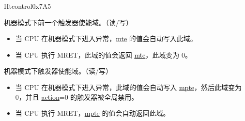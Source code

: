 \begin{register}{H}{tcontrol}{0x7A5}\label{regdesc:TCONTROL}
%
%
%
%
\regnewline%
\begin{regdesc}\begin{reglist}
\label{fielddesc:TCONTROLMPTE}\item [mpte] 机器模式下前一个触发器使能域。（读/写）
\begin{itemize}
    \setlength\itemsep{-1em}
    \item 当 CPU 在机器模式下进入异常，\hyperref[fielddesc:TCONTROLMTE]{mte} 的值会自动写入此域。
    \item 当 CPU 执行 MRET，此域的值会返回 \hyperref[fielddesc:TCONTROLMTE]{mte}，此域变为 0。
\end{itemize}
\label{fielddesc:TCONTROLMTE}\item [mte] 机器模式下触发器使能域。（读/写）
\begin{itemize}
    \setlength\itemsep{-1em}
    \item 当 CPU 在机器模式下进入异常，此域的值会自动写入 \hyperref[fielddesc:TCONTROLMPTE]{mpte}，然后此域变为 0，并且 \hyperref[fielddesc:MCONTROLACTION]{action}=0 的触发器被全局禁用。
    \item 当 CPU 执行 MRET，\hyperref[fielddesc:TCONTROLMPTE]{mpte} 的值会自动返回此域。
\end{itemize}
\end{reglist}\end{regdesc}
\end{register}

